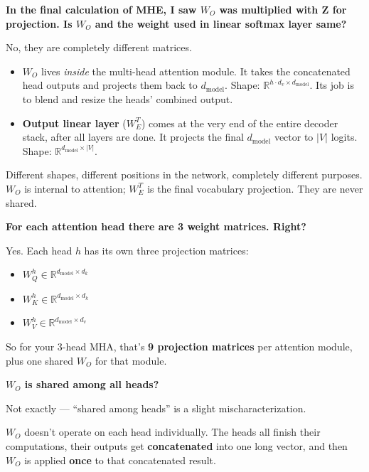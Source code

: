 \bigskip

\textbf{In the final calculation of MHE, I saw $W_O$ was multiplied with Z for projection. Is $W_O$ and the weight used in linear softmax layer same?}

No, they are completely different matrices.

\begin{itemize}
  \item $W_O$ lives \textit{inside} the multi-head attention module. It takes the concatenated head outputs and projects them back to $d_{\text{model}}$. Shape: $\mathbb{R}^{h \cdot d_v \times d_{\text{model}}}$. Its job is to blend and resize the heads' combined output.
  \item \textbf{Output linear layer} ($W_E^T$) comes at the very end of the entire decoder stack, after all layers are done. It projects the final $d_{\text{model}}$ vector to $|V|$ logits. Shape: $\mathbb{R}^{d_{\text{model}} \times |V|}$.
\end{itemize}

Different shapes, different positions in the network, completely different purposes. $W_O$ is internal to attention; $W_E^T$ is the final vocabulary projection. They are never shared.

\bigskip

\textbf{For each attention head there are 3 weight matrices. Right?}

Yes. Each head $h$ has its own three projection matrices:
\begin{itemize}
  \item $W_Q^h \in \mathbb{R}^{d_{\text{model}} \times d_k}$
  \item $W_K^h \in \mathbb{R}^{d_{\text{model}} \times d_k}$
  \item $W_V^h \in \mathbb{R}^{d_{\text{model}} \times d_v}$
\end{itemize}

So for your 3-head MHA, that's \textbf{9 projection matrices} per attention module, plus one shared $W_O$ for that module.

\bigskip

\textbf{$W_O$ is shared among all heads?}

Not exactly --- ``shared among heads'' is a slight mischaracterization.

$W_O$ doesn't operate on each head individually. The heads all finish their computations, their outputs get \textbf{concatenated} into one long vector, and then $W_O$ is applied \textbf{once} to that concatenated result.

